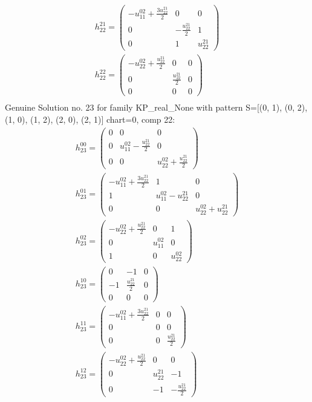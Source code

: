 \documentclass[a4paper, 11pt, twoside, onecolumn]{article}
\begin{document}
\begin{landscape}
\begin{gather*}
	 h_{22}^{21}=\begin{pmatrix}- u^{02}_{11} + \frac{3 u^{21}_{22}}{2} & 0 & 0\\0 & - \frac{u^{21}_{22}}{2} & 1\\0 & 1 & u^{21}_{22}\end{pmatrix}\\ 
	 h_{22}^{22}=\begin{pmatrix}- u^{02}_{22} + \frac{u^{21}_{22}}{2} & 0 & 0\\0 & \frac{u^{21}_{22}}{2} & 0\\0 & 0 & 0\end{pmatrix}\\ 
\end{gather*} 
Genuine Solution no. 23 for family KP_real_None with pattern S=[(0, 1), (0, 2), (1, 0), (1, 2), (2, 0), (2, 1)] chart=0, comp 22: 
\begin{gather*} 
	 h_{23}^{00}=\begin{pmatrix}0 & 0 & 0\\0 & u^{02}_{11} - \frac{u^{21}_{22}}{2} & 0\\0 & 0 & u^{02}_{22} + \frac{u^{21}_{22}}{2}\end{pmatrix}\\ 
	 h_{23}^{01}=\begin{pmatrix}- u^{02}_{11} + \frac{3 u^{21}_{22}}{2} & 1 & 0\\1 & u^{02}_{11} - u^{21}_{22} & 0\\0 & 0 & u^{02}_{22} + u^{21}_{22}\end{pmatrix}\\ 
	 h_{23}^{02}=\begin{pmatrix}- u^{02}_{22} + \frac{u^{21}_{22}}{2} & 0 & 1\\0 & u^{02}_{11} & 0\\1 & 0 & u^{02}_{22}\end{pmatrix}\\ 
	 h_{23}^{10}=\begin{pmatrix}0 & -1 & 0\\-1 & \frac{u^{21}_{22}}{2} & 0\\0 & 0 & 0\end{pmatrix}\\ 
	 h_{23}^{11}=\begin{pmatrix}- u^{02}_{11} + \frac{3 u^{21}_{22}}{2} & 0 & 0\\0 & 0 & 0\\0 & 0 & \frac{u^{21}_{22}}{2}\end{pmatrix}\\ 
	 h_{23}^{12}=\begin{pmatrix}- u^{02}_{22} + \frac{u^{21}_{22}}{2} & 0 & 0\\0 & u^{21}_{22} & -1\\0 & -1 & - \frac{u^{21}_{22}}{2}\end{pmatrix}\\ 

\end{gather*}
\end{landscape}
\end{document}
